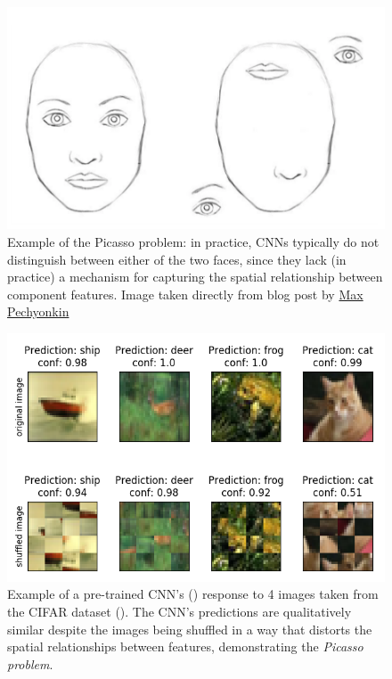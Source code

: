 \documentclass[12pt]{article}
\let\oldcite=\cite
\renewcommand{\cite}[1]{\textcolor[rgb]{0, .121, .388}{\oldcite{#1}}}
\begin{document}
\begin{figure}[!h]
    \centering
    \includegraphics[scale=.4]{figures/picassoProb.png}
    \caption{Example of the Picasso problem: in practice, CNNs typically do not distinguish between either of the two faces, since they lack (in practice) a mechanism for capturing the spatial relationship between component features. Image taken directly from blog post by \href{https://medium.com/ai\%C2\%B3-theory-practice-business/understanding-hintons-capsule-networks-part-i-intuition-b4b559d1159b}{Max Pechyonkin}}
    \label{fig:picassoProb}
\end{figure} 

\begin{figure}[!h]
    \centering
    \includegraphics[scale=.7]{figures/googlenetFail.png}
    \caption{Example of a pre-trained CNN's (\cite{szegedy2015going}) response to 4 images taken from the CIFAR dataset (\cite{krizhevsky2009learning}). The CNN's predictions are qualitatively similar despite the images being shuffled in a way that distorts the spatial relationships between features, demonstrating the \emph{Picasso problem}.}
    \label{fig:googlenetFail}
\end{figure} 
\end{document}
